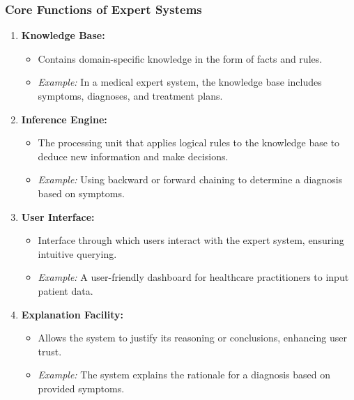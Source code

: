 \documentclass[aspectratio=169]{beamer}
\begin{document}
\begin{frame}[fragile]
    \frametitle{Core Functions of Expert Systems}
    \begin{enumerate}
        \item \textbf{Knowledge Base:}
        \begin{itemize}
            \item Contains domain-specific knowledge in the form of facts and rules. 
            \item \textit{Example:} In a medical expert system, the knowledge base includes symptoms, diagnoses, and treatment plans.
        \end{itemize}

        \item \textbf{Inference Engine:}
        \begin{itemize}
            \item The processing unit that applies logical rules to the knowledge base to deduce new information and make decisions.
            \item \textit{Example:} Using backward or forward chaining to determine a diagnosis based on symptoms.
        \end{itemize}

        \item \textbf{User Interface:}
        \begin{itemize}
            \item Interface through which users interact with the expert system, ensuring intuitive querying.
            \item \textit{Example:} A user-friendly dashboard for healthcare practitioners to input patient data.
        \end{itemize}

        \item \textbf{Explanation Facility:}
        \begin{itemize}
            \item Allows the system to justify its reasoning or conclusions, enhancing user trust.
            \item \textit{Example:} The system explains the rationale for a diagnosis based on provided symptoms.
        \end{itemize}
    \end{enumerate}
\end{frame}
\end{document}
